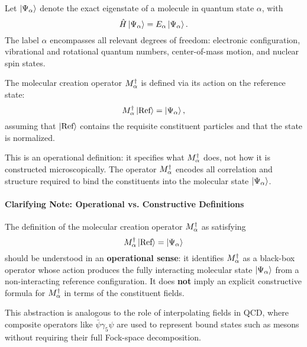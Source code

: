 Let \(\ket{\Psi_\alpha}\) denote the exact eigenstate of a molecule in quantum state \(\alpha\), with
\begin{equation}
	\hat{H} \ket{\Psi_\alpha} = E_\alpha \ket{\Psi_\alpha}.
	\label{eq:mol_eigenstate}
\end{equation}
The label \(\alpha\) encompasses all relevant degrees of freedom: electronic configuration, vibrational and rotational quantum numbers, center-of-mass motion, and nuclear spin states.

\begin{definition}
	\label{def:molecular_creation}
	The molecular creation operator \(M^\dagger_{\alpha}\) is defined via its action on the reference state:
	\begin{equation}
		M^\dagger_{\alpha} \ket{\text{Ref}} = \ket{\Psi_\alpha},
		\label{eq:mol_creation_def}
	\end{equation}
	assuming that \(\ket{\text{Ref}}\) contains the requisite constituent particles and that the state is normalized.
\end{definition}

This is an operational definition: it specifies what \(M^\dagger_{\alpha}\) does, not how it is constructed microscopically. The operator \(M^\dagger_{\alpha}\) encodes all correlation and structure required to bind the constituents into the molecular state \(\ket{\Psi_\alpha}\).

\paragraph{Clarifying Note: Operational vs. Constructive Definitions}
The definition of the molecular creation operator \(M^\dagger_{\alpha}\) as satisfying
\begin{equation}
    M^\dagger_{\alpha} \ket{\text{Ref}} = \ket{\Psi_\alpha}
\end{equation}
should be understood in an \textbf{operational sense}: it identifies \(M^\dagger_{\alpha}\) as a black-box operator whose action produces the fully interacting molecular state \(\ket{\Psi_\alpha}\) from a non-interacting reference configuration. It does \textbf{not} imply an explicit constructive formula for \(M^\dagger_{\alpha}\) in terms of the constituent fields.

This abstraction is analogous to the role of interpolating fields in QCD, where composite operators like \(\bar{\psi}\gamma_5 \psi\) are used to represent bound states such as mesons without requiring their full Fock-space decomposition.

